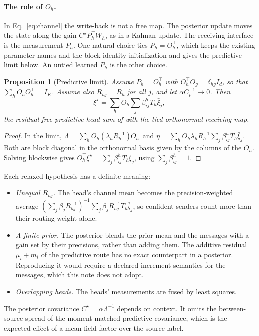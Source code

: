 \documentclass[11pt]{article}
\newtheorem{proposition}{Proposition}
\theoremstyle{definition}
\theoremstyle{remark}
\begin{document}
\paragraph{The role of $O_h$.}
In Eq.~\eqref{eq:channel} the write-back is not a free map. The posterior update moves the state along the gain $C^\star P_h^\top W_h$, as in a Kalman update. The receiving interface is the measurement $P_h$. One natural choice ties $P_h=O_h^\top$, which keeps the existing parameter names and the block-identity initialization and gives the predictive limit below. An untied learned $P_h$ is the other choice.

\begin{proposition}[Predictive limit]
\label{prop:predictive_limit}
Assume $P_h=O_h^\top$ with $O_h^\top O_g=\delta_{hg}I_d$, so that $\sum_hO_hO_h^\top=I_K$. Assume also $R_{hj}=R_h$ for all $j$, and let $\alpha C_p^{-1}\to0$. Then
\begin{equation}
\xi^\star=\sum_hO_h\sum_j\beta_{ij}^hT_h\bar\xi_j,
\end{equation}
the residual-free predictive head sum of \citep{dennis2026predictive} with the tied orthonormal receiving map.
\end{proposition}

\begin{proof}
In the limit, $\Lambda=\sum_hO_h(\lambda_hR_h^{-1})O_h^\top$ and $\eta=\sum_hO_h\lambda_hR_h^{-1}\sum_j\beta_{ij}^hT_h\bar\xi_j$. Both are block diagonal in the orthonormal basis given by the columns of the $O_h$. Solving blockwise gives $O_h^\top\xi^\star=\sum_j\beta_{ij}^hT_h\bar\xi_j$, using $\sum_j\beta_{ij}^h=1$.
\end{proof}

Each relaxed hypothesis has a definite meaning:
\begin{itemize}
\item \emph{Unequal $R_{hj}$.} The head's channel mean becomes the precision-weighted average $(\sum_j\beta_jR_{hj}^{-1})^{-1}\sum_j\beta_jR_{hj}^{-1}T_h\bar\xi_j$, so confident senders count more than their routing weight alone.
\item \emph{A finite prior.} The posterior blends the prior mean and the messages with a gain set by their precisions, rather than adding them. The additive residual $\mu_i+m_i$ of the predictive route has no exact counterpart in a posterior. Reproducing it would require a declared increment semantics for the messages, which this note does not adopt.
\item \emph{Overlapping heads.} The heads' measurements are fused by least squares.
\end{itemize}
The posterior covariance $C^\star=\alpha\Lambda^{-1}$ depends on context. It omits the between-source spread of the moment-matched predictive covariance, which is the expected effect of a mean-field factor over the source label.
\end{document}
